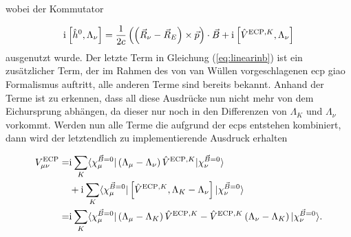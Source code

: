 	wobei der Kommutator
	
	\begin{equation}
	\mathrm{i}\mkern1mu\left[\hat{h}^0 ,\Lambda_\nu\right]=\frac{1}{2c}\left(\left(\vec{R}_\nu-\vec{R}_E\right)\times\vec{p}\right)\cdot\vec{B}+\mathrm{i}\mkern1mu\left[\hat{V}^{\textrm{ECP},K} ,\Lambda_\nu\right]
	\end{equation}
	ausgenutzt wurde. Der letzte Term in Gleichung (\ref{eq:linearinb}) ist ein zusätzlicher Term, der im Rahmen des von van Wüllen vorgeschlagenen \ac{ecp} \ac{giao} Formalismus auftritt, alle anderen Terme sind bereits bekannt. Anhand der Terme ist zu erkennen, dass all diese Ausdrücke nun nicht mehr von dem Eichursprung abhängen, da dieser nur noch in den Differenzen von $\Lambda_K$ und $\Lambda_\nu$ vorkommt. Werden nun alle Terme die aufgrund der \acp{ecp} entstehen kombiniert, dann wird der letztendlich zu implementierende Ausdruck erhalten
	
	\begin{equation}\label{eq:vecpmunu}
	\begin{aligned}
	V_{\mu\nu}^{\textrm{ECP}}=&\mathrm{i}\mkern1mu\sum_K\langle\chi_\mu^{\vec{B}=0}\vert\left(\Lambda_\mu -\Lambda_\nu\right)\hat{V}^{\textrm{ECP},K}\vert\chi_\nu^{\vec{B}=0}\rangle\\
	&+\mathrm{i}\mkern1mu\sum_K\langle \chi_\mu^{\vec{B}=0}\vert\left[\hat{V}^{\textrm{ECP},K},\Lambda_K-\Lambda_\nu\right]\vert\chi_\nu^{\vec{B}=0}\rangle\\
	=&\mathrm{i}\mkern1mu\sum_K\langle\chi_\mu^{\vec{B}=0}\vert\left(\Lambda_\mu -\Lambda_K\right)\hat{V}^{\textrm{ECP},K}-\hat{V}^{\textrm{ECP},K}\left(\Lambda_\nu -\Lambda_K\right)\vert\chi_\nu^{\vec{B}=0}\rangle .
	\end{aligned}
	\end{equation}
	
